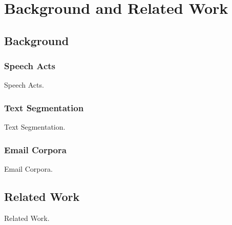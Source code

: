 
\chapter{Background and Related Work}

\section{Background}

\subsection{Speech Acts}

Speech Acts.

\subsection{Text Segmentation}

Text Segmentation.

\subsection{Email Corpora}

Email Corpora.

\section{Related Work}

Related Work.
